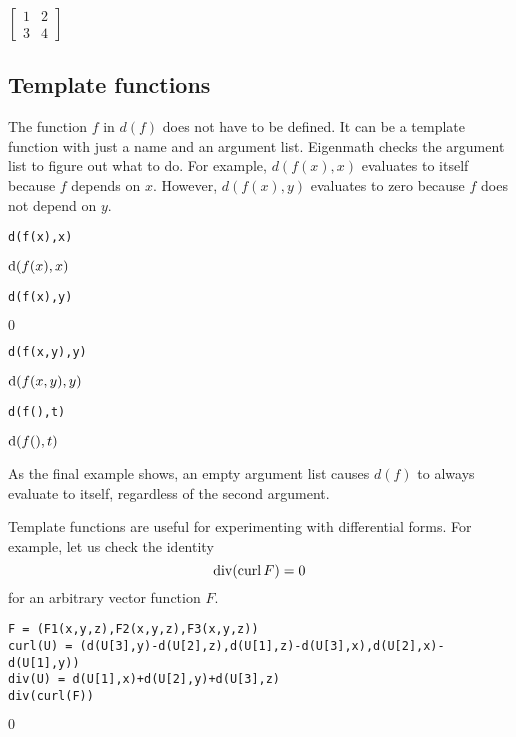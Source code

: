 $\displaystyle \begin{bmatrix}1&2\\3&4\end{bmatrix}$

\subsection{Template functions}
The function $f$ in $d(f)$ does not have to be defined.
It can be a template function with just a name and an argument list.
Eigenmath checks the argument list to figure out what to do.
For example, $d(f(x),x)$ evaluates to itself because $f$ depends on $x$.
However, $d(f(x),y)$ evaluates to zero because $f$ does not depend on $y$.

\begin{Verbatim}[formatcom=\color{blue},samepage=true]
d(f(x),x)
\end{Verbatim}

$\displaystyle {\rm d}(f(x),x)$

\begin{Verbatim}[formatcom=\color{blue},samepage=true]
d(f(x),y)
\end{Verbatim}

$\displaystyle 0$

\begin{Verbatim}[formatcom=\color{blue},samepage=true]
d(f(x,y),y)
\end{Verbatim}

$\displaystyle {\rm d}(f(x,y),y)$

\begin{Verbatim}[formatcom=\color{blue},samepage=true]
d(f(),t)
\end{Verbatim}

$\displaystyle {\rm d}(f(),t)$

As the final example shows, an empty argument list causes
$d(f)$ to always evaluate to itself, regardless
of the second argument.

Template functions are useful for experimenting with differential forms.
For example, let us check the identity
$$\mathop{\rm div}(\mathop{\rm curl}{F})=0$$
for an arbitrary vector function $F$.

\begin{Verbatim}[formatcom=\color{blue},samepage=true]
F = (F1(x,y,z),F2(x,y,z),F3(x,y,z))
curl(U) = (d(U[3],y)-d(U[2],z),d(U[1],z)-d(U[3],x),d(U[2],x)-d(U[1],y))
div(U) = d(U[1],x)+d(U[2],y)+d(U[3],z)
div(curl(F))
\end{Verbatim}

$\displaystyle 0$
